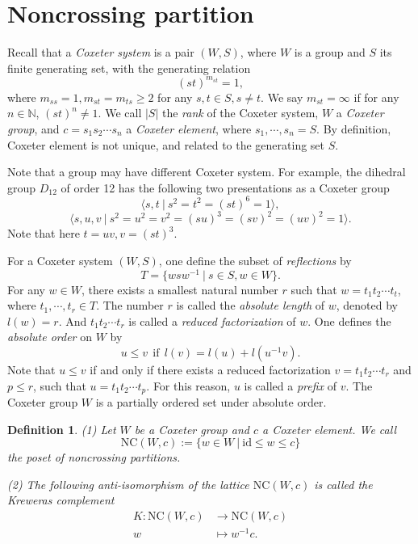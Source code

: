\documentclass[a4paper, 11pt, reqno]{amsart}
\numberwithin{equation}{section}
\newtheorem{defn}[thm]{Definition}
\theoremstyle{remark}
\theoremstyle{definition}
\begin{document}
\section{Noncrossing partition}

Recall that a \emph{Coxeter system} is a pair $(W,S)$, where $W$ is a group and $S$ its finite generating set, with the generating relation 
\[(st)^{m_{st}}=1,\]
where $m_{ss}=1, m_{st}=m_{ts} \geq 2$ for any $s,t \in S, s\neq t$. We say $m_{st}=\infty$ if for any $n \in \mathbb N$, $(st)^n \neq 1$. We call $|S|$ the \emph{rank} of the Coxeter system, $W$ a \emph{Coxeter group}, and $c=s_1 s_2 \cdots s_n$ a \emph{Coxeter element}, where ${s_1, \cdots, s_n}=S$. By definition, Coxeter element is not unique, and related to the generating set $S$. 

Note that a group may have different Coxeter system. For example, the dihedral group $D_{12}$ of order 12 has the following two presentations as a Coxeter group
\[
    \langle s,t \ | \ s^2=t^2=(st)^6=1 \rangle,
\]
\[
    \langle s,u,v \ | \ s^2=u^2=v^2=(su)^3=(sv)^2=(uv)^2=1 \rangle.
\]
Note that here $t=uv, v=(st)^3$.

For a Coxeter system $(W,S)$, one define the subset of \emph{reflections} by
\[T=\{wsw^{-1} \ | \ s \in S, w \in W \}.\]
For any $w \in W$, there exists a smallest natural number $r$ such that $w=t_1 t_2 \cdots t_t$, where $t_1,\cdots,t_r \in T$. The number $r$ is called the \emph{absolute length} of $w$, denoted by $l(w)=r$. And $t_1 t_2 \cdots t_r$ is called a \emph{reduced factorization} of $w$. One defines the \emph{absolute order} on $W$ by
\[
    u \leq v \ \ \text{if} \ \ l(v) = l(u) + l(u^{-1} v).
\]
Note that $u \leq v$ if and only if there exists a reduced factorization $v=t_1 t_2 \cdots t_r$ and $p \leq r$, such that $u=t_1 t_2 \cdots t_p$. For this reason, $u$ is called a \emph{prefix} of $v$. The Coxeter group $W$ is a partially ordered set under absolute order. 

\begin{defn}
(1) Let $W$ be a Coxeter group and $c$ a Coxeter element. We call 
\[
  \mathrm{NC}(W,c):=\{w \in W \ | \ \mathrm{id} \leq w \leq c \}
\]
the poset of \emph{noncrossing partitions}.

(2) The following anti-isomorphism of the lattice $\mathrm{NC}(W,c)$ is called the \emph{Kreweras complement} 
\begin{align*}
   K: \mathrm{NC}(W,c) &\to \mathrm{NC}(W,c) \\
   w &\mapsto w^{-1}c.
\end{align*}
\end{defn}
\end{document}
